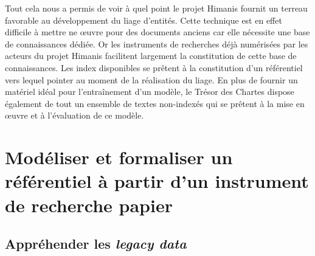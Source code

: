 \documentclass[a4paper,12pt,twoside]{book}
\makeatletter
\newcommand{\parttext}[1]{\def\@parttext{#1}}
\makeatother
\begin{document}
	Tout cela nous a permis de voir à quel point le projet Himanis fournit un terreau favorable au développement du liage d'entités. Cette technique est en effet difficile à mettre ne œuvre pour des documents anciens car elle nécessite une base de connaissances dédiée. Or les instruments de recherches déjà numérisées par les acteurs du projet Himanis facilitent largement la constitution de cette base de connaissances. Les index disponibles se prêtent à la constitution d'un référentiel vers lequel pointer au moment de la réalisation du liage. En plus de fournir un matériel idéal pour l'entraînement d'un modèle, le Trésor des Chartes dispose également de tout un ensemble de textes non-indexés qui se prêtent à la mise en œuvre et à l'évaluation de ce modèle.
	
	\parttext{Le stage que nous avons réalisé s'est principalement concentré sur la constitution d'un référentiel pouvant servir de base de connaissances pour la mise en œuvre du liage d'entités. Nous consacrerons donc cette deuxième partie au travail de modélisation et de formalisation du référentiel à partir d'un index papier, activité qui a occupé la majeure partie de notre stage. Nous nous sommes concentrés ici sur l'index du premier volume de l'inventaire analytique des registres du Trésor des Chartes portant sur les registres JJ 37 à JJ 50 et paru en 1958. Pour rendre compte de ce travail, nous décrirons dans un premier chapitre les différentes difficultés rencontrées pour comprendre et manipuler cet instrument de recherche. Puis nous dédierons un second chapitre à l'analyse des relations entre les entités. Nous consacrerons enfin un troisième chapitre à la transformation de l'index en une base de données relationnelle.}
	
	\part{Modéliser et formaliser un référentiel à partir d’un instrument de recherche papier}
	
	
	\chapter{Appréhender les \textit{legacy data}}
	
\end{document}
